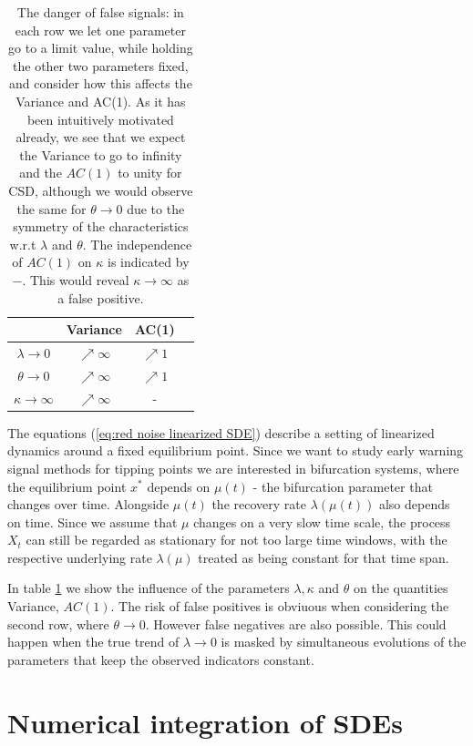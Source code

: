 \documentclass[%
thesis=student,%
coverpage=false,%
titlepage=false,%
headmarks=true, %
english,%
font=libertine, %
math=newpxtx, %
BCOR=5mm,%
coverBCOR=11mm%
]{tumbook}
\begin{document}
\begin{table}[h!]
\centering
\begin{tabular}{|c|c|c|c|}
\hline
& Variance & AC(1)\\
\hline
$\lambda \rightarrow 0$ & $\nearrow \infty$ & $\nearrow 1$ \\
$\theta \rightarrow 0$  & $\nearrow \infty$ & $\nearrow 1$ \\
$\kappa \rightarrow \infty$ & $\nearrow \infty$ & - \\    
\hline
\end{tabular}
\caption{The danger of false signals: in each row we let one parameter go to a limit value, while holding the other two parameters fixed, and consider how this affects the Variance and AC(1). As it has been intuitively motivated already, we see that we expect the Variance to go to infinity and the $AC(1)$ to unity for CSD, although we would observe the same for $\theta \rightarrow 0$ due to the symmetry of the characteristics w.r.t $\lambda$ and $\theta$. The independence of $AC(1)$ on $\kappa$ is indicated by $-$. This would reveal $\kappa \rightarrow \infty$ as a false positive.}
\label{tab:danger_of_false_signals}
\end{table}

The equations (\ref{eq:red noise linearized SDE}) describe a setting of linearized dynamics around a fixed equilibrium point. Since we want to study early warning signal methods for tipping points we are interested in bifurcation systems, where the equilibrium point $x^{*}$ depends on $\mu(t)$ - the bifurcation parameter that changes over time. Alongside $\mu(t)$ the recovery rate $\lambda(\mu(t))$ also depends on time. Since we assume that $\mu$ changes on a very slow time scale, the process $X_{t}$ can still be regarded as stationary for not too large time windows, with the respective underlying rate $\lambda(\mu)$ treated as being constant for that time span. 

In table \ref{tab:danger_of_false_signals} we show the influence of the parameters $\lambda, \kappa$ and $\theta$ on the quantities Variance, $AC(1)$. The risk of false positives is obviuous when considering the second row, where $\theta \rightarrow 0$. However false negatives are also possible. This could happen when the true trend of $\lambda \rightarrow 0$ is masked by simultaneous evolutions of the parameters that keep the observed indicators constant.






\chapter{Numerical integration of SDEs}
\end{document}
